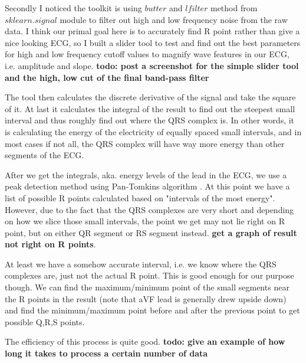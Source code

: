 \documentclass[%
 reprint,
 amsmath,amssymb,
 aps,
]{revtex4-2}
\begin{document}
Secondly I noticed the toolkit is using $butter$ and $lfilter$ method from $sklearn.signal$ module to filter out high and low frequency noise from the raw data. I think our primal goal here is to accurately find R point rather than give a nice looking ECG, so I built a slider tool to test and find out the best parameters for high and low frequency cutoff values to magnify wave features in our ECG, i.e. amplitude and slope. \textbf{todo: post a screenshot for the simple slider tool and the high, low cut of the final band-pass filter}

The tool then calculates the discrete derivative of the signal and take the square of it. At last it calculates the integral of the result to find out the steepest small interval and thus roughly find out where the QRS complex is. In other words, it is calculating the energy of the electricity of equally spaced small intervals, and in most cases if not all, the QRS complex will have way more energy than other segments of the ECG. 

After we get the integrals, aka. energy levels of the lead in the ECG, we use a peak detection method \cite{Slavic} using Pan-Tomkins algorithm \cite{Sznajder}. At this point we have a list of possible R points calculated based on "intervals of the most energy". However, due to the fact that the QRS complexes are very short and depending on how we slice those small intervals, the point we get may not lie right on R point, but on either QR segment or RS segment instead. \textbf{get a graph of result not right on R points}. 

At least we have a somehow accurate interval, i.e. we know where the QRS complexes are, just not the actual R point. This is good enough for our purpose though. We can find the maximum/minimum point of the small segments near the R points in the result (note that aVF lead is generally drew upside down) and find the minimum/maximum point before and after the previous point to get possible Q,R,S points.

The efficiency of this process is quite good. \textbf{todo: give an example of how long it takes to process a certain number of data}
\end{document}
